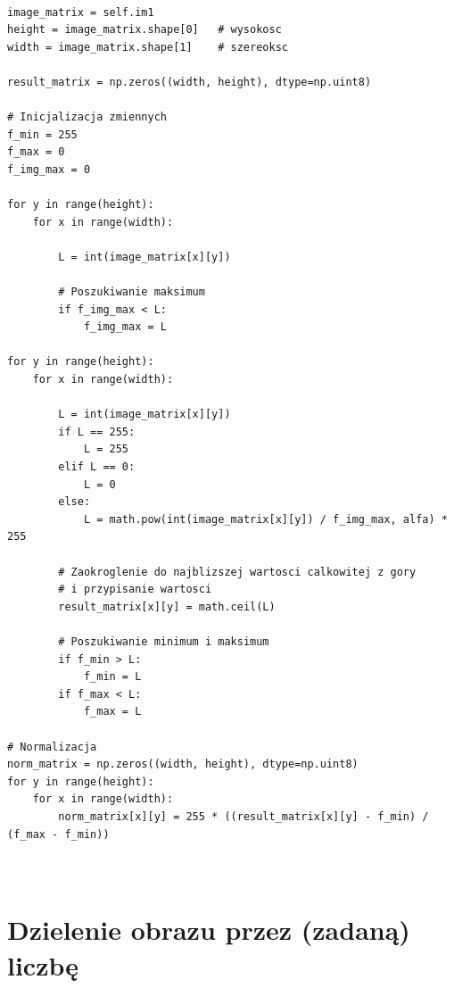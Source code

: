 \documentclass[final,a4paper,openany,12pt]{mwbk}
\begin{document}
\begin{lstlisting}[caption=Potęgowanie obrazu szarego (z zadaną potęgą)]

image_matrix = self.im1
height = image_matrix.shape[0]   # wysokosc
width = image_matrix.shape[1]    # szereoksc

result_matrix = np.zeros((width, height), dtype=np.uint8)

# Inicjalizacja zmiennych
f_min = 255
f_max = 0
f_img_max = 0

for y in range(height):
    for x in range(width):  
        
        L = int(image_matrix[x][y])

        # Poszukiwanie maksimum
        if f_img_max < L:
            f_img_max = L

for y in range(height):
    for x in range(width):  
        
        L = int(image_matrix[x][y])
        if L == 255:
            L = 255
        elif L == 0:
            L = 0
        else:
            L = math.pow(int(image_matrix[x][y]) / f_img_max, alfa) * 255

        # Zaokroglenie do najblizszej wartosci calkowitej z gory
        # i przypisanie wartosci
        result_matrix[x][y] = math.ceil(L)

        # Poszukiwanie minimum i maksimum
        if f_min > L:
            f_min = L
        if f_max < L:
            f_max = L

# Normalizacja
norm_matrix = np.zeros((width, height), dtype=np.uint8)
for y in range(height):
    for x in range(width):
        norm_matrix[x][y] = 255 * ((result_matrix[x][y] - f_min) / (f_max - f_min))



\end{lstlisting}

\section {Dzielenie obrazu przez (zadaną) liczbę }

\hfill
\\\\
\indent
\end{document}
